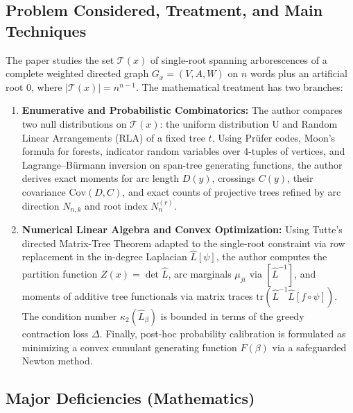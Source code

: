 \documentclass[11pt,a4paper]{article}
\begin{document}
\subsection{Problem Considered, Treatment, and Main Techniques}
The paper studies the set $\mathcal{T}(x)$ of single-root spanning arborescences of a complete weighted directed graph $G_x = (V, A, W)$ on $n$ words plus an artificial root $0$, where $|\mathcal{T}(x)| = n^{n-1}$. The mathematical treatment has two branches:
\begin{enumerate}
    \item \textbf{Enumerative and Probabilistic Combinatorics:} The author compares two null distributions on $\mathcal{T}(x)$: the uniform distribution $\mathrm{U}$ and Random Linear Arrangements ($\mathrm{RLA}$) of a fixed tree $t$. Using Pr\"ufer codes, Moon's formula for forests, indicator random variables over 4-tuples of vertices, and Lagrange--B\"urmann inversion on span-tree generating functions, the author derives exact moments for arc length $D(y)$, crossings $C(y)$, their covariance $\mathrm{Cov}(D,C)$, and exact counts of projective trees refined by arc direction $N_{n,k}$ and root index $N_n^{(r)}$.
    \item \textbf{Numerical Linear Algebra and Convex Optimization:} Using Tutte's directed Matrix-Tree Theorem adapted to the single-root constraint via row replacement in the in-degree Laplacian $\widehat{L}[\psi]$, the author computes the partition function $Z(x) = \det \widehat{L}$, arc marginals $\mu_{ji}$ via $[\widehat{L}^{-1}]$, and moments of additive tree functionals via matrix traces $\mathrm{tr}(\widehat{L}^{-1}\widehat{L}[f \circ \psi])$. The condition number $\kappa_2(\widehat{L}_\beta)$ is bounded in terms of the greedy contraction loss $\Delta$. Finally, post-hoc probability calibration is formulated as minimizing a convex cumulant generating function $F(\beta)$ via a safeguarded Newton method.
\end{enumerate}

\subsection{Major Deficiencies (Mathematics)}
\end{document}
